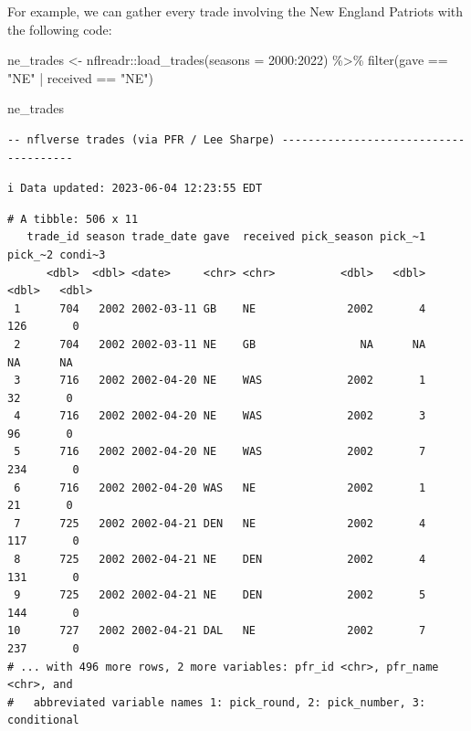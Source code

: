 \documentclass[
  letterpaper,
]{krantz}
\newenvironment{Shaded}{\begin{snugshade}}{\end{snugshade}}
\newcommand{\AttributeTok}[1]{\textcolor[rgb]{0.40,0.45,0.13}{#1}}
\newcommand{\DecValTok}[1]{\textcolor[rgb]{0.68,0.00,0.00}{#1}}
\newcommand{\FunctionTok}[1]{\textcolor[rgb]{0.28,0.35,0.67}{#1}}
\newcommand{\NormalTok}[1]{\textcolor[rgb]{0.00,0.23,0.31}{#1}}
\newcommand{\OtherTok}[1]{\textcolor[rgb]{0.00,0.23,0.31}{#1}}
\newcommand{\SpecialCharTok}[1]{\textcolor[rgb]{0.37,0.37,0.37}{#1}}
\newcommand{\StringTok}[1]{\textcolor[rgb]{0.13,0.47,0.30}{#1}}
\begin{document}
For example, we can gather every trade involving the New England
Patriots with the following code:

\begin{Shaded}
\begin{Highlighting}[]
\NormalTok{ne\_trades }\OtherTok{\textless{}{-}}\NormalTok{ nflreadr}\SpecialCharTok{::}\FunctionTok{load\_trades}\NormalTok{(}\AttributeTok{seasons =} \DecValTok{2000}\SpecialCharTok{:}\DecValTok{2022}\NormalTok{) }\SpecialCharTok{\%\textgreater{}\%}
  \FunctionTok{filter}\NormalTok{(gave }\SpecialCharTok{==} \StringTok{"NE"} \SpecialCharTok{|}\NormalTok{ received }\SpecialCharTok{==} \StringTok{"NE"}\NormalTok{)}

\NormalTok{ne\_trades}
\end{Highlighting}
\end{Shaded}

\begin{verbatim}
-- nflverse trades (via PFR / Lee Sharpe) --------------------------------------
\end{verbatim}

\begin{verbatim}
i Data updated: 2023-06-04 12:23:55 EDT
\end{verbatim}

\begin{verbatim}
# A tibble: 506 x 11
   trade_id season trade_date gave  received pick_season pick_~1 pick_~2 condi~3
      <dbl>  <dbl> <date>     <chr> <chr>          <dbl>   <dbl>   <dbl>   <dbl>
 1      704   2002 2002-03-11 GB    NE              2002       4     126       0
 2      704   2002 2002-03-11 NE    GB                NA      NA      NA      NA
 3      716   2002 2002-04-20 NE    WAS             2002       1      32       0
 4      716   2002 2002-04-20 NE    WAS             2002       3      96       0
 5      716   2002 2002-04-20 NE    WAS             2002       7     234       0
 6      716   2002 2002-04-20 WAS   NE              2002       1      21       0
 7      725   2002 2002-04-21 DEN   NE              2002       4     117       0
 8      725   2002 2002-04-21 NE    DEN             2002       4     131       0
 9      725   2002 2002-04-21 NE    DEN             2002       5     144       0
10      727   2002 2002-04-21 DAL   NE              2002       7     237       0
# ... with 496 more rows, 2 more variables: pfr_id <chr>, pfr_name <chr>, and
#   abbreviated variable names 1: pick_round, 2: pick_number, 3: conditional
\end{verbatim}
\end{document}
